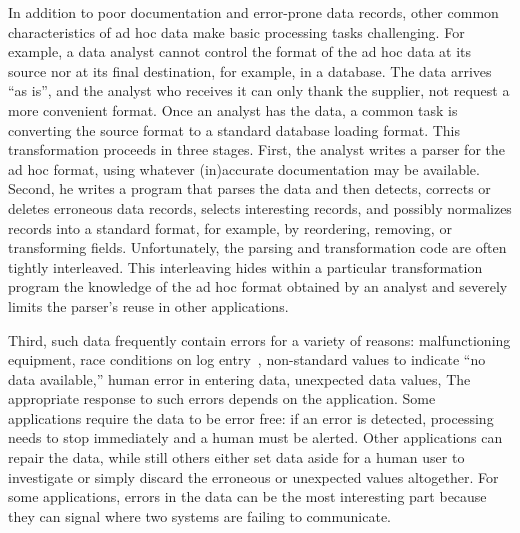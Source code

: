 
In addition to poor documentation and error-prone data records, other
common characteristics of ad hoc data make basic processing
tasks challenging.  For example, a data analyst cannot control the format of the
ad hoc data at its source nor at its final destination, for example,
in a database.  The data arrives ``as is'', and the analyst who
receives it can only thank the supplier, not request a more convenient
format.  Once an analyst has the data, a common task is converting the
source format to a standard database loading format.  This
transformation proceeds in three stages.  First, the analyst writes a
parser for the ad hoc format, using whatever (in)accurate
documentation may be available.  Second, he writes a program that
parses the data and then detects, corrects or deletes erroneous data
records, selects interesting records, and possibly normalizes records
into a standard format, for example, by reordering, removing, or
transforming fields.  Unfortunately, the parsing and transformation
code are often tightly interleaved.  This interleaving hides within a
particular transformation program the knowledge of the ad hoc format
obtained by an analyst and severely limits the parser's reuse in other
applications.



Third, such data frequently contain errors for a variety of reasons:
malfunctioning equipment, race conditions on log entry~\cite{wpp},
non-standard values to indicate ``no data available,'' human error in
entering data, unexpected data values, \etc{} The appropriate response
to such errors depends on the application.  Some applications require
the data to be error free: if an error is detected, processing needs
to stop immediately and a human must be alerted.  Other applications
can repair the data, while still others either set data aside for a
human user to investigate or simply discard the erroneous or
unexpected values altogether.  For some applications, errors in the
data can be the most interesting part because they can signal where
two systems are failing to communicate.


